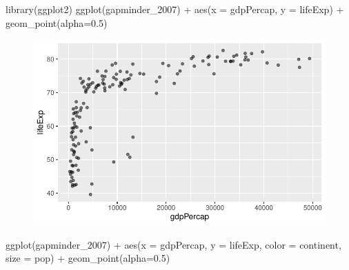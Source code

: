 \documentclass[
  letterpaper,
  DIV=11,
  numbers=noendperiod]{scrartcl}
\newenvironment{Shaded}{\begin{snugshade}}{\end{snugshade}}
\newcommand{\AttributeTok}[1]{\textcolor[rgb]{0.40,0.45,0.13}{#1}}
\newcommand{\FloatTok}[1]{\textcolor[rgb]{0.68,0.00,0.00}{#1}}
\newcommand{\FunctionTok}[1]{\textcolor[rgb]{0.28,0.35,0.67}{#1}}
\newcommand{\NormalTok}[1]{\textcolor[rgb]{0.00,0.23,0.31}{#1}}
\newcommand{\SpecialCharTok}[1]{\textcolor[rgb]{0.37,0.37,0.37}{#1}}
\begin{document}
\begin{Shaded}
\begin{Highlighting}[]
\FunctionTok{library}\NormalTok{(ggplot2)}
\FunctionTok{ggplot}\NormalTok{(gapminder\_2007) }\SpecialCharTok{+} 
  \FunctionTok{aes}\NormalTok{(}\AttributeTok{x =}\NormalTok{ gdpPercap, }\AttributeTok{y =}\NormalTok{ lifeExp) }\SpecialCharTok{+}
  \FunctionTok{geom\_point}\NormalTok{(}\AttributeTok{alpha=}\FloatTok{0.5}\NormalTok{)}
\end{Highlighting}
\end{Shaded}

\begin{figure}[H]

{\centering \includegraphics{class05_files/figure-pdf/unnamed-chunk-19-1.pdf}

}

\end{figure}

\begin{Shaded}
\begin{Highlighting}[]
\FunctionTok{ggplot}\NormalTok{(gapminder\_2007) }\SpecialCharTok{+} 
  \FunctionTok{aes}\NormalTok{(}\AttributeTok{x =}\NormalTok{ gdpPercap, }\AttributeTok{y =}\NormalTok{ lifeExp, }\AttributeTok{color =}\NormalTok{ continent, }\AttributeTok{size =}\NormalTok{ pop) }\SpecialCharTok{+}
  \FunctionTok{geom\_point}\NormalTok{(}\AttributeTok{alpha=}\FloatTok{0.5}\NormalTok{)}
\end{Highlighting}
\end{Shaded}
\end{document}
